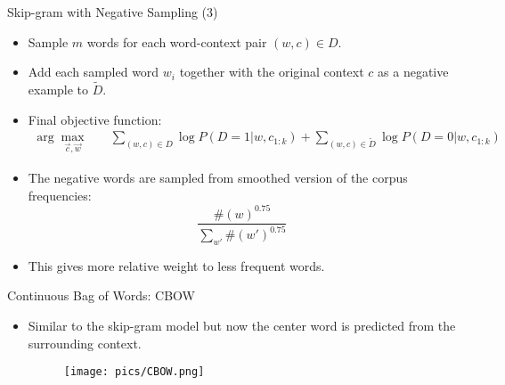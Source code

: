 \documentclass[handout]{beamer}
\begin{document}
\begin{frame}{Skip-gram with Negative Sampling (3)}
\begin{scriptsize}
\begin{itemize}

\item Sample $m$ words for each word-context pair  $(w,c) \in D$.
\item Add each sampled word $w_i$ together with the original context $c$ as a negative example to $\tilde{D}$.



\item Final objective function:
\begin{equation}
\begin{split}
\operatorname{arg} \max_{\vec{c}, \vec{w}} & \quad \sum_{(w,c) \in D}{\log P(D = 1| w,c_{1:k})} + \sum_{(w,c) \in \tilde{D}} \log P(D = 0| w,c_{1:k})
\end{split}
\end{equation}

\item The negative words are sampled from smoothed version of the corpus frequencies:
\begin{displaymath}
\frac{\#(w)^{0.75}}{\sum_{w'}\#(w')^{0.75}}
\end{displaymath}

\item This gives more relative weight to less frequent words.

\end{itemize}
\end{scriptsize}
\end{frame}






\begin{frame}{Continuous Bag of Words: CBOW}
\begin{scriptsize}
\begin{itemize}
\item  Similar to the skip-gram model but now the center word is predicted from the surrounding context.
 \begin{figure}[h]
    	\texttt{[image: pics/CBOW.png]}
    \end{figure}
       
        
\end{itemize}
\end{scriptsize}
\end{frame}
\end{document}
